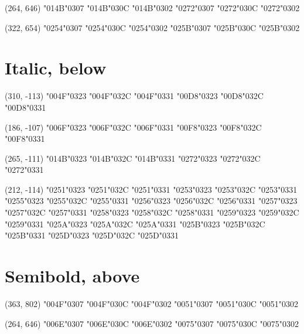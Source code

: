 (264, 646) \char"014B\cgj\char"0307 \char"014B\cgj\char"030C \char"014B\cgj\char"0302 \char"0272\cgj\char"0307 \char"0272\cgj\char"030C \char"0272\cgj\char"0302

(322, 654) \char"0254\cgj\char"0307 \char"0254\cgj\char"030C \char"0254\cgj\char"0302 \char"025B\cgj\char"0307 \char"025B\cgj\char"030C \char"025B\cgj\char"0302


\section*{Italic, below}

(310, -113) \char"004F\cgj\char"0323 \char"004F\cgj\char"032C \char"004F\cgj\char"0331 \char"00D8\cgj\char"0323 \char"00D8\cgj\char"032C \char"00D8\cgj\char"0331

(186, -107) \char"006F\cgj\char"0323 \char"006F\cgj\char"032C \char"006F\cgj\char"0331 \char"00F8\cgj\char"0323 \char"00F8\cgj\char"032C \char"00F8\cgj\char"0331

(265, -111) \char"014B\cgj\char"0323 \char"014B\cgj\char"032C \char"014B\cgj\char"0331 \char"0272\cgj\char"0323 \char"0272\cgj\char"032C \char"0272\cgj\char"0331

(212, -114) \char"0251\cgj\char"0323 \char"0251\cgj\char"032C \char"0251\cgj\char"0331 \char"0253\cgj\char"0323 \char"0253\cgj\char"032C \char"0253\cgj\char"0331 \char"0255\cgj\char"0323 \char"0255\cgj\char"032C \char"0255\cgj\char"0331 \char"0256\cgj\char"0323 \char"0256\cgj\char"032C \char"0256\cgj\char"0331 \char"0257\cgj\char"0323 \char"0257\cgj\char"032C \char"0257\cgj\char"0331 \char"0258\cgj\char"0323 \char"0258\cgj\char"032C \char"0258\cgj\char"0331 \char"0259\cgj\char"0323 \char"0259\cgj\char"032C \char"0259\cgj\char"0331 \char"025A\cgj\char"0323 \char"025A\cgj\char"032C \char"025A\cgj\char"0331 \char"025B\cgj\char"0323 \char"025B\cgj\char"032C \char"025B\cgj\char"0331 \char"025D\cgj\char"0323 \char"025D\cgj\char"032C \char"025D\cgj\char"0331


\section*{Semibold, above}

(363, 802) \char"004F\cgj\char"0307 \char"004F\cgj\char"030C \char"004F\cgj\char"0302 \char"0051\cgj\char"0307 \char"0051\cgj\char"030C \char"0051\cgj\char"0302

(264, 646) \char"006E\cgj\char"0307 \char"006E\cgj\char"030C \char"006E\cgj\char"0302 \char"0075\cgj\char"0307 \char"0075\cgj\char"030C \char"0075\cgj\char"0302


